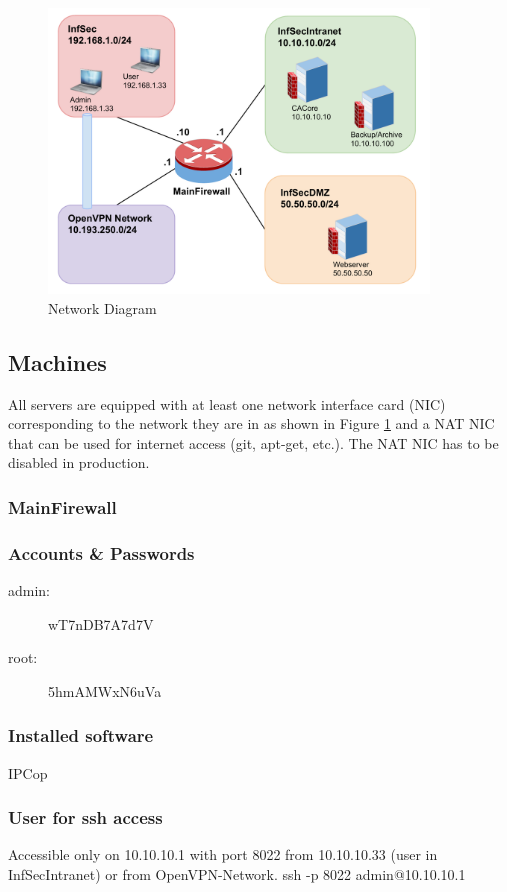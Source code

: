 \documentclass[a4paper, toc=index, 12pt, DIV14, twoside, BCOR2cm, headsepline, numbers=noenddot, bibliography=totoc]{scrbook}
\begin{document}
\begin{figure}[H]
  \centering
    \includegraphics[width=0.9\textwidth]{images/sysseclab_net_diagram.pdf}  
  \caption{Network Diagram}
  \label{netdiag}
\end{figure}

\subsection{Machines}
All servers are equipped with at least one network interface card (NIC) corresponding to the network they are in as shown in Figure \ref{netdiag} and a NAT NIC that can be used for internet access (git, apt-get, etc.). The NAT NIC has to be disabled in production.

\subsubsection{MainFirewall}
\subsubsection*{Accounts \& Passwords}
\begin{multicols}{2}
\begin{description}
\item[admin:] wT7nDB7A7d7V
\item[root:] 5hmAMWxN6uVa
\end{description}
\end{multicols}
\subsubsection*{Installed software}
IPCop
\subsubsection*{User for ssh access}
Accessible only on 10.10.10.1 with port 8022 from 10.10.10.33 (user in InfSecIntranet) or from OpenVPN-Network.\newline
ssh -p 8022 admin@10.10.10.1
\end{document}
